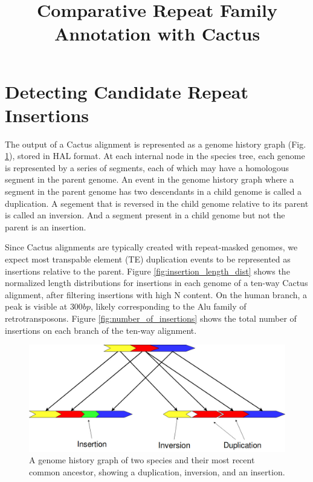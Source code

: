 \documentclass{article}
\title{Comparative Repeat Family Annotation with Cactus}
\begin{document}
\maketitle
\section{Detecting Candidate Repeat Insertions}


The output of a Cactus alignment is represented as a genome history graph (Fig. \ref{fig:ghg}), stored in HAL format. At each internal node in the species tree, each genome is represented by a series of segments, each of which may have a homologous segment in the parent genome. An event in the genome history graph where a segment in the parent genome has two descendants in a child genome is called a duplication. A segement that is reversed in the child genome relative to its parent is called an inversion. And a segment present in a child genome but not the parent is an insertion.

Since Cactus alignments are typically created with repeat-masked genomes, we expect most transpable element (TE) duplication events to be represented as insertions relative to the parent. Figure \ref{fig:insertion_length_dist} shows the normalized length distributions for insertions in each genome of a ten-way Cactus alignment, after filtering insertions with high N content. On the human branch, a peak is visible at $300 bp$, likely corresponding to the Alu family of retrotransposons. Figure \ref{fig:number_of_insertions} shows the total number of insertions on each branch of the ten-way alignment.
\begin{figure}[h]
  \centering
  \includegraphics[width=\textwidth]{figures/genome_history}
  \caption{A genome history graph of two species and their most recent common ancestor, showing a duplication, inversion, and an insertion.}
  \label{fig:ghg}
\end{figure}
\end{document}

